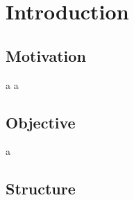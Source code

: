 \chapter{Introduction}

\section{Motivation} \newpage a \newpage a

\section{Objective} \newpage a

\section{Structure}